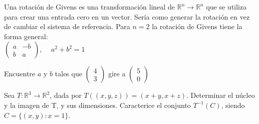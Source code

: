 \begin{exercise}
\item
Una rotación de Givens es una transformación lineal de $\mathbb{R}^n \rightarrow \mathbb{R}^n$ que se utiliza para crear una entrada cero en un vector. Sería como generar la rotación en vez de cambiar el sistema de referencia. Para 
$n=2$ la rotación de Givens tiene la forma general:\\

$\left(\begin{array}{cc}a &-b \\b & a
\end{array}
 \right)$, $ \quad a^2 + b^2 =1$

\bigskip

\noindent
Encuentre $a$ y $b$ tales que $\left(\begin{array}{c}4 \\3
\end{array}
 \right)$ gire a $\left(\begin{array}{c}5  \\0
\end{array}
 \right)$
 \end{exercise}


\bigskip


 \vspace{0.25cm}
\begin{exercise}
  \item

Sea $T:\mathbb{R}^3 \rightarrow \mathbb{R}^2$, dada por
$T((x,y,z))=(x+y,x+z)$. Determinar  el núcleo y la imagen de T, y
sus dimensiones. Caracterice el conjunto $T^{-1}(C)$, siendo
$C=\{(x,y):x=1\}$.
\end{exercise}

